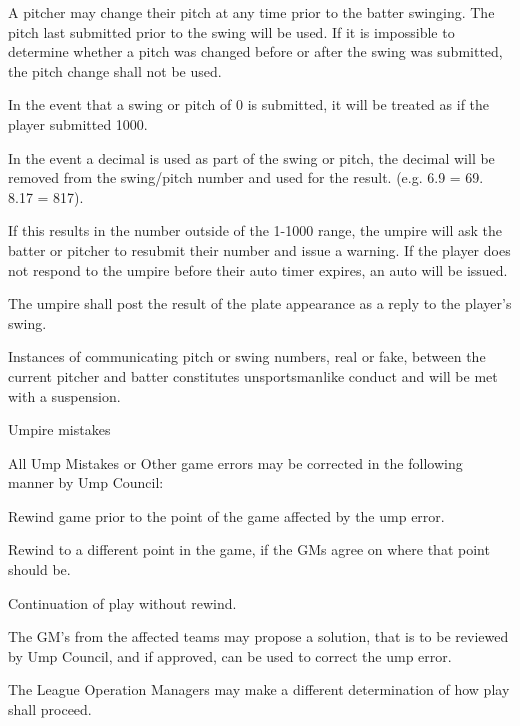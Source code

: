 \begin{deepEnumerate}
\begin{deepEnumerate}
\begin{deepEnumerate}
			\item A pitcher may change their pitch at any time prior to the batter swinging. The pitch last submitted prior to the swing will be used.
			If it is impossible to determine whether a pitch was changed before or after the swing was submitted, the pitch change shall not be used.
			\item In the event that a swing or pitch of 0 is submitted, it will be treated as if the player submitted 1000.
			\item In the event a decimal is used as part of the swing or pitch, the decimal will be removed from the swing/pitch number and used for the result. (e.g. 6.9 = 69. 8.17 = 817). 
			\begin{deepEnumerate}
				\item If this results in the number outside of the 1-1000 range, the umpire will ask the batter or pitcher to resubmit their number and issue a warning. If the player does not respond to the umpire before their auto timer expires, an auto will be issued. 
			\end{deepEnumerate}
		\end{deepEnumerate}
		\item The umpire shall post the result of the plate appearance as a reply to the player's swing.
		\item Instances of communicating pitch or swing numbers, real or fake, 
		between the current pitcher and batter constitutes unsportsmanlike conduct and will be met with a suspension.
		\item Umpire mistakes
		\begin{deepEnumerate}
			\item All Ump Mistakes or Other game errors may be corrected in the following manner by Ump Council:
			\begin{deepEnumerate}
				\item Rewind game prior to the point of the game affected by the ump error.
				\item Rewind to a different point in the game, if the GMs agree on where that point should be.
				\item Continuation of play without rewind.
			\end{deepEnumerate}
			\item The GM’s from the affected teams may propose a solution, that is to be reviewed by Ump Council, and if approved, can be used to correct the ump error.
			\item The League Operation Managers may make a different determination of how play shall proceed.

\end{deepEnumerate}
\end{deepEnumerate}
\end{deepEnumerate}
